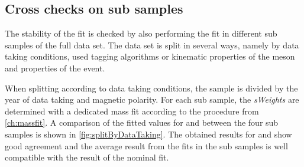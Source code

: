 \subsection{Cross checks on sub samples}
\label{sec:valOnSub Sample}

The stability of the fit is checked by also performing the fit in different sub samples of the full data set.
The data set is split in several ways, namely by data taking conditions, used tagging algorithms or kinematic properties of the \Bz meson and properties of the event.

When splitting according to data taking conditions, the \BdToDpi sample is divided by the year of data taking and magnetic polarity.
For each sub sample, the \emph{sWeights} are determined with a dedicated mass fit according to the procedure from \cref{ch:massfit}.
A comparison of the fitted values for \Sf and \Sfbar between the four sub samples is shown in \cref{fig:splitByDataTaking}.
The obtained results for \Sf and \Sfbar show good agreement and the average result from the fits in the sub samples is well compatible with the result of the nominal fit.
